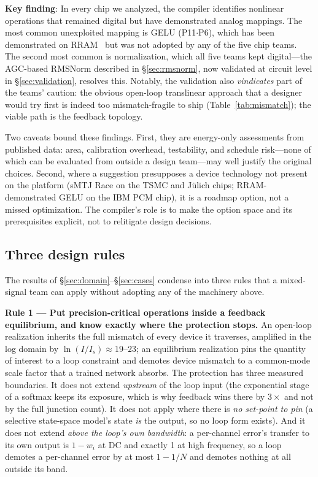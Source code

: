 \documentclass[11pt]{article}
\begin{document}
\textbf{Key finding}: In every chip we analyzed, the compiler identifies nonlinear operations that remained digital but have demonstrated analog mappings. The most common unexploited mapping is GELU (P11$\cdot$P6), which has been demonstrated on RRAM~\cite{rram_swish2022,raceit2023} but was not adopted by any of the five chip teams. The second most common is normalization, which all five teams kept digital---the AGC-based RMSNorm described in \S\ref{sec:rmsnorm}, now validated at circuit level in \S\ref{sec:validation}, resolves this. Notably, the validation also \textit{vindicates} part of the teams' caution: the obvious open-loop translinear approach that a designer would try first is indeed too mismatch-fragile to ship (Table~\ref{tab:mismatch}); the viable path is the feedback topology.

Two caveats bound these findings. First, they are energy-only assessments from published data: area, calibration overhead, testability, and schedule risk---none of which can be evaluated from outside a design team---may well justify the original choices. Second, where a suggestion presupposes a device technology not present on the platform (sMTJ Race on the TSMC and J\"ulich chips; RRAM-demonstrated GELU on the IBM PCM chip), it is a roadmap option, not a missed optimization. The compiler's role is to make the option space and its prerequisites explicit, not to relitigate design decisions.

\subsection{Three design rules}
\label{sec:rules}

The results of \S\ref{sec:domain}--\S\ref{sec:cases} condense into three rules that a mixed-signal team can apply without adopting any of the machinery above.

\textbf{Rule 1 --- Put precision-critical operations inside a feedback equilibrium, and know exactly where the protection stops.} An open-loop realization inherits the full mismatch of every device it traverses, amplified in the log domain by $\ln(I/I_s) \approx 19$--$23$; an equilibrium realization pins the quantity of interest to a loop constraint and demotes device mismatch to a common-mode scale factor that a trained network absorbs. The protection has three measured boundaries. It does not extend \textit{upstream} of the loop input (the exponential stage of a softmax keeps its exposure, which is why feedback wins there by $3\times$ and not by the full junction count). It does not apply where there is \textit{no set-point to pin} (a selective state-space model's state \textit{is} the output, so no loop form exists). And it does not extend \textit{above the loop's own bandwidth}: a per-channel error's transfer to its own output is $1-w_i$ at DC and exactly 1 at high frequency, so a loop demotes a per-channel error by at most $1-1/N$ and demotes nothing at all outside its band.
\end{document}
